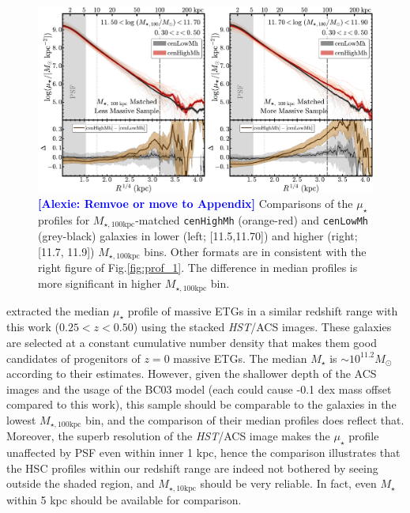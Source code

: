 \documentclass{emulateapj}
\def\rbcg{\texttt{cenHighMh}}
\def\nbcg{\texttt{cenLowMh}}
\def\mstar{{$M_{\star}$}}
\def\minn{{$M_{\star,10\mathrm{kpc}}$}}
\def\mtot{{$M_{\star,100\mathrm{kpc}}$}}
\def\mden{{$\mu_{\star}$}}
\newcommand{\alexie}[1]{\textcolor{blue}{\textbf{[Alexie: #1]}}}
\begin{document}
\begin{CJK*}{UTF8}{gbsn}
  \begin{figure}[t]
      \centering 
      \includegraphics[width=\textwidth]{fig/redbcg_prof_2}
      \caption{\alexie{Remvoe or move to Appendix} Comparisons of the \mden{} profiles for \mtot{}-matched \rbcg{} 
          (orange-red) and \nbcg{} (grey-black) galaxies in lower (left; [11.5,11.70]) 
          and higher (right; [11.7, 11.9]) \mtot{} bins. 
          Other formats are in consistent with the right figure of Fig.\ref{fig:prof_1}.
          The difference in median profiles is more significant in higher \mtot{} bin.}
      \label{fig:prof_2}
  \end{figure}

    \citet{Patel2013} extracted the median \mden{} profile of massive ETGs in a similar 
    redshift range with this work ($0.25 < z < 0.50$) using the stacked \textit{HST}/ACS
    images. 
    These galaxies are selected at a constant cumulative number density that makes them  
    good candidates of progenitors of $z=0$ massive ETGs.  
    The median \mstar{} is $\sim 10^{11.2} M_{\odot}$ according to their estimates.  
    However, given the shallower depth of the ACS images and the usage of the BC03 model 
    (each could cause -0.1 dex mass offset compared to this work), this sample should be 
    comparable to the galaxies in the lowest \mtot{} bin, and the comparison of their 
    median profiles does reflect that.  
    Moreover, the superb resolution of the \textit{HST}/ACS image makes the \mden{} 
    profile unaffected by PSF even within inner 1 kpc, hence the comparison illustrates 
    that the HSC profiles within our redshift range are indeed not bothered by 
    seeing outside the shaded region, and \minn{} should be very reliable.
    In fact, even \mstar{} within 5 kpc should be available for comparison.  
  

\end{CJK*}
\end{document}
